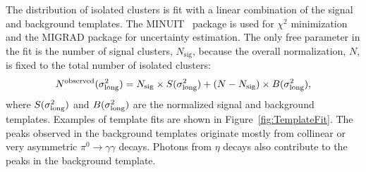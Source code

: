 The distribution of isolated clusters is fit with a linear combination of the signal and background templates. The \textsc{MINUIT}~\cite{James:1975dr} package is used for $\chi^{2}$ minimization and the \textsc{MIGRAD} package for uncertainty estimation. The only free parameter in the fit is the number of signal clusters, $N_{\mathrm{sig}}$, because the overall normalization, $N$, is fixed to the total number of isolated clusters:
\begin{equation}
N^{\mathrm{observed}}(\sigma^{2}_{\mathrm{long}}) = N_{\mathrm{sig}}\times S(\sigma^{2}_{\mathrm{long}}) + (N-N_{\mathrm{sig}})\times B(\sigma^{2}_{\mathrm{long}}),
\end{equation}
where $S(\sigma^{2}_{\mathrm{long}})$ and $B(\sigma^{2}_{\mathrm{long}})$ are the normalized signal and background templates. Examples of template fits are shown in Figure~\ref{fig:TemplateFit}.
The peaks observed in the background templates originate mostly from collinear or very asymmetric $\pi^{0}\to\gamma\gamma$ decays. Photons from $\eta$ decays also contribute to the peaks in the background template.


